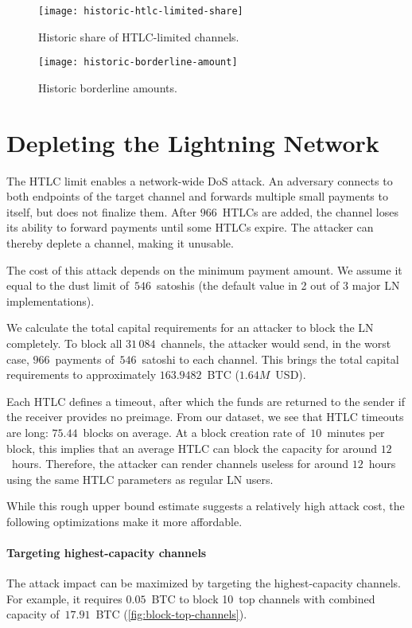 \begin{figure}[tb]
	\centering
	\texttt{[image: historic-htlc-limited-share]}
	\caption{Historic share of HTLC-limited channels.}
	\label{fig:historic-htlc-limited-share}
\end{figure}

\begin{figure}[tb]
	\centering
	\texttt{[image: historic-borderline-amount]}
	\caption{Historic borderline amounts.}
	\label{fig:historic-borderline-amount}
\end{figure}


\section{Depleting the Lightning Network}

The HTLC limit enables a network-wide DoS attack.
An adversary connects to both endpoints of the target channel and forwards multiple small payments to itself, but does not finalize them.
After $966$~HTLCs are added, the channel loses its ability to forward payments until some HTLCs expire.
The attacker can thereby deplete a channel, making it unusable.

The cost of this attack depends on the minimum payment amount.
We assume it equal to the dust limit of~$546$~satoshis (the default value in 2 out of 3 major LN implementations).

We calculate the total capital requirements for an attacker to block the LN completely.
To block all $31\,084$~channels, the attacker would send, in the worst case, $966$~payments of~$546$~satoshi to each channel.
This brings the total capital requirements to approximately $163.9482$~BTC ($1.64M$~USD).

Each HTLC defines a timeout, after which the funds are returned to the sender if the receiver provides no preimage.
From our dataset, we see that HTLC timeouts are long: $75.44$~blocks on average.
At a block creation rate of~$10$~minutes per block, this implies that an average HTLC can block the capacity for around $12$~hours.
Therefore, the attacker can render channels useless for around $12$~hours using the same HTLC parameters as regular LN users.

While this rough upper bound estimate suggests a relatively high attack cost, the following optimizations make it more affordable.


\paragraph{Targeting highest-capacity channels}
The attack impact can be maximized by targeting the highest-capacity channels.
For example, it requires $0.05$~BTC to block 10~top channels with combined capacity of~$17.91$~BTC (\cref{fig:block-top-channels}).

